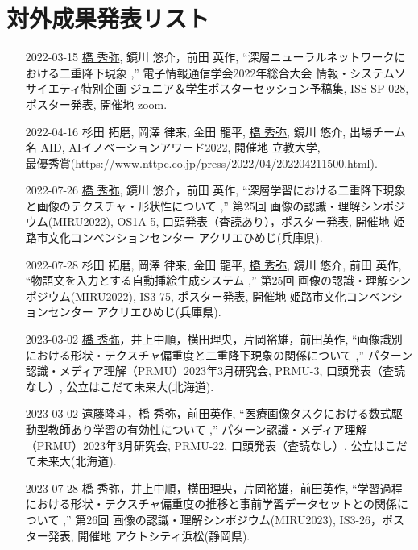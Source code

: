 \chapter{対外成果発表リスト}
\begin{enumerate}
    \item[2022-03-15] \underline{橋 秀弥}, 鏡川 悠介，前田 英作, ``深層ニューラルネットワークにおける二重降下現象
,''  電子情報通信学会2022年総合大会 情報・システムソサイエティ特別企画 ジュニア＆学生ポスターセッション予稿集, ISS-SP-028, ポスター発表, 開催地 zoom.
    \item[2022-04-16] 杉田 拓磨, 岡澤 律来, 金田 龍平, \underline{橋 秀弥}, 鏡川 悠介, 出場チーム名 AID, AIイノベーションアワード2022, 開催地 立教大学, \\最優秀賞(https://www.nttpc.co.jp/press/2022/04/202204211500.html).
    \item[2022-07-26] \underline{橋 秀弥}, 鏡川 悠介，前田 英作, ``深層学習における二重降下現象と画像のテクスチャ・形状性について
,''  第25回 画像の認識・理解シンポジウム(MIRU2022), OS1A-5, 口頭発表（査読あり），ポスター発表, 開催地 姫路市文化コンベンションセンター  アクリエひめじ(兵庫県).
    \item[2022-07-28] 杉田 拓磨, 岡澤 律来, 金田 龍平, \underline{橋 秀弥}, 鏡川 悠介, 前田 英作, ``物語文を入力とする自動挿絵生成システム
,''  第25回 画像の認識・理解シンポジウム(MIRU2022), IS3-75, ポスター発表, 開催地 姫路市文化コンベンションセンター  アクリエひめじ(兵庫県).
    \item[2023-03-02] \underline{橋 秀弥}，井上中順，横田理央，片岡裕雄，前田英作, ``画像識別における形状・テクスチャ偏重度と二重降下現象の関係について
,''  パターン認識・メディア理解（PRMU）2023年3月研究会, PRMU-3, 口頭発表（査読なし）, 公立はこだて未来大(北海道).
    \item[2023-03-02] 遠藤隆斗，\underline{橋 秀弥}，前田英作, ``医療画像タスクにおける数式駆動型教師あり学習の有効性について
,''  パターン認識・メディア理解（PRMU）2023年3月研究会, PRMU-22, 口頭発表（査読なし）, 公立はこだて未来大(北海道).
    \item[2023-07-28] \underline{橋 秀弥}，井上中順，横田理央，片岡裕雄，前田英作, ``学習過程における形状・テクスチャ偏重度の推移と事前学習データセットとの関係について
,''  第26回 画像の認識・理解シンポジウム(MIRU2023), IS3-26，ポスター発表, 開催地 アクトシティ浜松(静岡県).




\end{enumerate}
